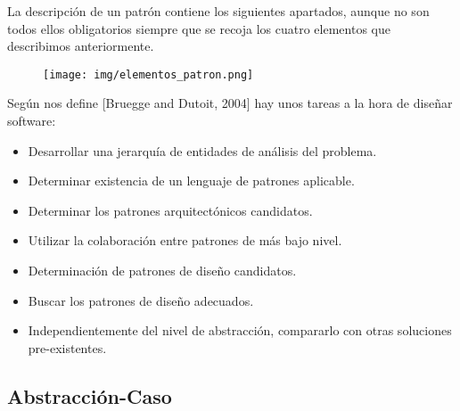 \documentclass[10pt,a4paper,titlepage]{article}
\begin{document}
La descripción de un patrón contiene los siguientes apartados, aunque no son todos ellos obligatorios siempre que se recoja los cuatro elementos que describimos anteriormente.\\
\begin{figure}[H] %
\centering
\texttt{[image: img/elementos\_patron.png]}
\end{figure}

Según nos define [Bruegge and Dutoit, 2004] hay unos tareas a la hora de diseñar software:
\begin{itemize}
\item Desarrollar una jerarquía de entidades de análisis del problema.
\item Determinar existencia de un lenguaje de patrones aplicable.
\item Determinar los patrones arquitectónicos candidatos.
\item Utilizar la colaboración entre patrones de más bajo nivel.
\item Determinación de patrones de diseño candidatos.
\item Buscar los patrones de diseño adecuados.
\item Independientemente del nivel de abstracción, compararlo con otras soluciones pre-existentes.
\end{itemize}

\subsection{Abstracción-Caso}
\end{document}
